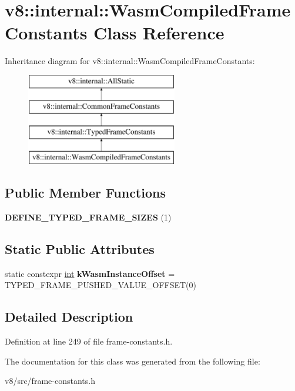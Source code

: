 \hypertarget{classv8_1_1internal_1_1WasmCompiledFrameConstants}{}\section{v8\+:\+:internal\+:\+:Wasm\+Compiled\+Frame\+Constants Class Reference}
\label{classv8_1_1internal_1_1WasmCompiledFrameConstants}
Inheritance diagram for v8\+:\+:internal\+:\+:Wasm\+Compiled\+Frame\+Constants\+:\begin{figure}[H]
\begin{center}
\leavevmode
\includegraphics[height=4.000000cm]{classv8_1_1internal_1_1WasmCompiledFrameConstants}
\end{center}
\end{figure}
\subsection*{Public Member Functions}
\begin{DoxyCompactItemize}
\item 
\mbox{\label{classv8_1_1internal_1_1WasmCompiledFrameConstants_ac935efa105d4de26681532bc3029048a}} 
{\bfseries D\+E\+F\+I\+N\+E\+\_\+\+T\+Y\+P\+E\+D\+\_\+\+F\+R\+A\+M\+E\+\_\+\+S\+I\+Z\+ES} (1)
\end{DoxyCompactItemize}
\subsection*{Static Public Attributes}
\begin{DoxyCompactItemize}
\item 
\mbox{\label{classv8_1_1internal_1_1WasmCompiledFrameConstants_a8c3b23aea47e379f58fe03bdf2528da3}} 
static constexpr \mbox{\hyperlink{classint}{int}} {\bfseries k\+Wasm\+Instance\+Offset} = T\+Y\+P\+E\+D\+\_\+\+F\+R\+A\+M\+E\+\_\+\+P\+U\+S\+H\+E\+D\+\_\+\+V\+A\+L\+U\+E\+\_\+\+O\+F\+F\+S\+ET(0)
\end{DoxyCompactItemize}


\subsection{Detailed Description}


Definition at line 249 of file frame-\/constants.\+h.



The documentation for this class was generated from the following file\+:\begin{DoxyCompactItemize}
\item 
v8/src/frame-\/constants.\+h\end{DoxyCompactItemize}
